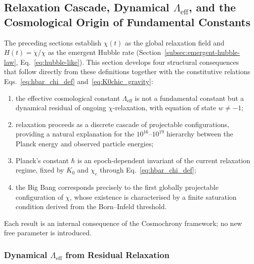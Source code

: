 \subsection{Relaxation Cascade, Dynamical $\Lambda_{\mathrm{eff}}$,
  and the Cosmological Origin of Fundamental Constants}
  \label{sec:relax-cascade}

  The preceding sections establish $\chi(t)$ as the global relaxation field
  and $H(t) = \dot{\chi}/\chi$ as the emergent Hubble rate (Section~\ref{subsec:emergent-hubble-law},
  Eq.~\eqref{eq:hubble-like}).
  This section develops four structural consequences that follow directly
  from these definitions together with the constitutive relations
  Eqs.~\eqref{eq:hbar_chi_def} and~\eqref{eq:K0chic_gravity}:
  \begin{enumerate}
    \item the effective cosmological constant $\Lambda_{\mathrm{eff}}$ is
    not a fundamental constant but a dynamical residual of ongoing
    $\chi$-relaxation, with equation of state $w \neq -1$;
    \item relaxation proceeds as a discrete cascade of projectable
    configurations, providing a natural explanation for the
    $10^{16}$--$10^{19}$ hierarchy between the Planck energy and
    observed particle energies;
    \item Planck's constant $\hbar$ is an epoch-dependent invariant of
    the current relaxation regime, fixed by $K_0$ and $\chi_c$ through
    Eq.~\eqref{eq:hbar_chi_def};
    \item the Big Bang corresponds precisely to the first globally
    projectable configuration of $\chi$, whose existence is
    characterised by a finite saturation condition derived from the
    Born--Infeld threshold.
  \end{enumerate}
  Each result is an internal consequence of the Cosmochrony framework;
  no new free parameter is introduced.

  \subsubsection*{Dynamical $\Lambda_{\mathrm{eff}}$ from Residual
  Relaxation}
    \label{sec:relax-cascade-lambda}

